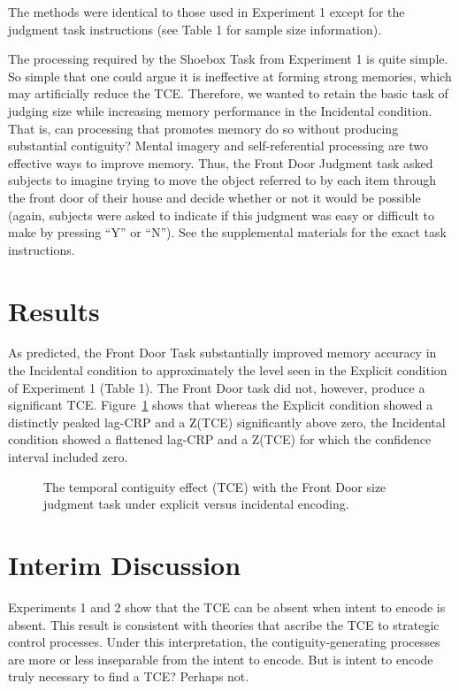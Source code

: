 \documentclass[man,natbib,floatsintext]{apa6} %
\begin{document}
The methods were identical to those used in Experiment 1 except for the judgment task instructions (see Table 1 for sample size information).

The processing required by the Shoebox Task from Experiment 1 is quite simple. So simple that one could argue it is  ineffective at forming strong memories, which may artificially reduce the TCE. Therefore, we wanted to retain the basic task of judging size while increasing memory performance in the Incidental condition. That is, can processing that promotes memory do so without producing substantial contiguity? Mental imagery and self-referential processing are two effective ways to improve memory. Thus, the Front Door Judgment task asked subjects to imagine trying to move the object referred to by each item through the front door of their house and decide whether or not it would be possible (again, subjects were asked to indicate if this judgment was easy or difficult to make by pressing ``Y'' or ``N'').
See the supplemental materials for the exact task instructions.

\section{Results}
As predicted, the Front Door Task substantially improved memory accuracy in the Incidental condition to approximately the level seen in the Explicit condition of Experiment 1 (Table 1). The Front Door task did not, however, produce a significant TCE. Figure~\ref{door} shows that whereas the Explicit condition showed a distinctly peaked lag-CRP and a Z(TCE) significantly above zero, the Incidental condition showed a flattened lag-CRP and a Z(TCE) for which the confidence interval included zero.

\begin{figure}%
\caption{The temporal contiguity effect (TCE) with the Front Door size judgment task under explicit versus incidental encoding. \paneltext}
\label{door}
\end{figure}

\section{Interim Discussion}
Experiments 1 and 2 show that the TCE can be absent when intent to encode is absent. This result is consistent with theories that ascribe the TCE to strategic control processes. Under this interpretation, the contiguity-generating processes are more or less inseparable from the intent to encode. But is intent to encode truly necessary to find a TCE? Perhaps not.
\end{document}

